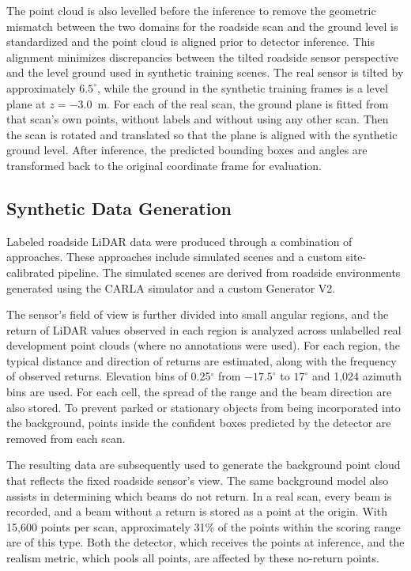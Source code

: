 \documentclass[conference]{IEEEtran}
\begin{document}
The point cloud is also levelled before the inference to remove the geometric mismatch between the two domains for the roadside scan and the ground level is standardized and the point cloud is aligned prior to detector inference. This alignment minimizes discrepancies between the tilted roadside sensor perspective and the level ground used in synthetic training scenes. The real sensor is tilted by approximately $6.5^\circ$, while the ground in the synthetic training frames is a level plane at $z=-3.0$~m. For each of the real scan, the ground plane is fitted from that scan’s own points, without labels and without using any other scan. Then the scan is rotated and translated so that the plane is aligned with the synthetic ground level. After inference, the predicted bounding boxes and angles are transformed back to the original coordinate frame for evaluation.

\subsection{Synthetic Data Generation}
\label{sec:synth}

Labeled roadside LiDAR data were produced through a combination of approaches.
These approaches include simulated scenes and a custom site-calibrated pipeline. The simulated scenes are derived from roadside environments generated using the CARLA
simulator and a custom Generator V2.

The sensor's field of view is further divided into small angular regions, and the return of LiDAR values observed in each region is analyzed across unlabelled real development point clouds (where no annotations were used). For each region, the typical distance and direction of returns are estimated, along with the frequency of observed returns. Elevation bins of 0.25$^\circ$ from $-17.5^\circ$ to $17^\circ$ and 1,024 azimuth bins are used. For each cell, the spread of the range and the beam direction are also stored. To prevent parked or stationary objects from being incorporated into the background, points inside the confident boxes predicted by the detector are removed from each scan.

The resulting data are subsequently used to generate the background point cloud that reflects the fixed roadside sensor's view. The same background model also assists in determining which beams do not return. In a real scan, every beam is recorded, and a beam without a return is stored as a point at the origin. With 15,600 points per scan, approximately 31\% of the points within the scoring range are of this type. Both the detector, which receives the points at inference, and the realism metric, which pools all points, are affected by these no-return points.
\end{document}
